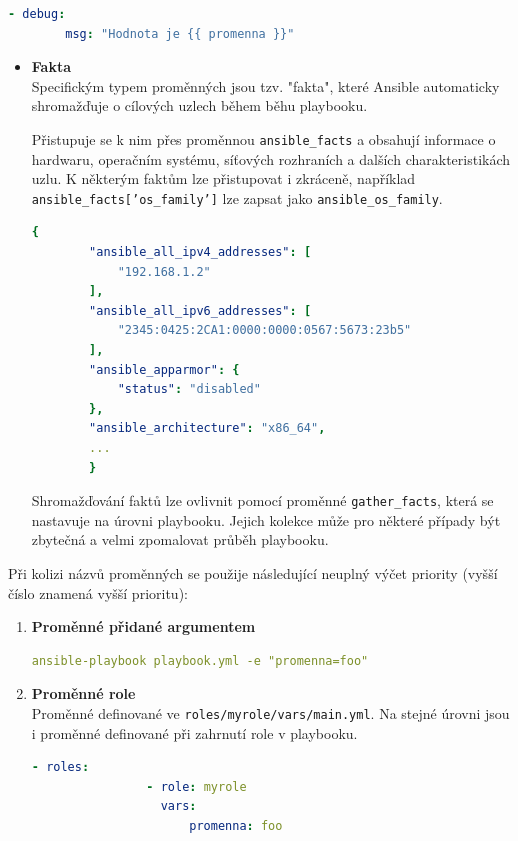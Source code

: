\begin{itemize}
    \begin{lstlisting}[language=YAML, caption={Použití proměnné}, label={lst:ansiblepromennapouziti}, captionpos=b]
    - debug:
        msg: "Hodnota je {{ promenna }}"
    \end{lstlisting}

    \begin{itemize}
        \item \textbf{Fakta} \\
        Specifickým typem proměnných jsou tzv. "fakta", které Ansible automaticky shromažďuje o cílových uzlech během běhu playbooku.
        
        Přistupuje se k nim přes proměnnou \texttt{ansible\_facts} a obsahují informace o hardwaru, operačním systému, síťových rozhraních a dalších charakteristikách uzlu.
        K některým faktům lze přistupovat i zkráceně, například \texttt{ansible\_facts['os\_family']} lze zapsat jako \texttt{ansible\_os\_family}. \cite{ansibledocs}
         
        \begin{lstlisting}[language=YAML, caption={Shromážděná fakta}, label={lst:ansiblefacts}, captionpos=b]
        {
        "ansible_all_ipv4_addresses": [
            "192.168.1.2"
        ],
        "ansible_all_ipv6_addresses": [
            "2345:0425:2CA1:0000:0000:0567:5673:23b5"
        ],
        "ansible_apparmor": {
            "status": "disabled"
        },
        "ansible_architecture": "x86_64",
        ...
        }
        \end{lstlisting}

        Shromažďování faktů lze ovlivnit pomocí proměnné \texttt{gather\_facts}, která se nastavuje na úrovni playbooku.
        Jejich kolekce může pro některé případy být zbytečná a velmi zpomalovat průběh playbooku. \cite{ansibledocs}
    \end{itemize}

    Při kolizi názvů proměnných se použije následující neuplný výčet priority (vyšší číslo znamená vyšší prioritu):
    \begin{enumerate}
        \item \textbf{Proměnné přidané argumentem}
        \begin{lstlisting}[language=YAML, caption={Proměnné přidané argumentem}, label={lst:ansibleargumentvar}, captionpos=b]
        ansible-playbook playbook.yml -e "promenna=foo"
        \end{lstlisting}

        \item \textbf{Proměnné role} \\
            Proměnné definované ve \texttt{roles/myrole/vars/main.yml}.
            Na stejné úrovni jsou i proměnné definované při zahrnutí role v playbooku.
            \begin{lstlisting}[language=YAML, caption={Proměnné při zahrnutí role}, label={lst:ansiblerolevar}, captionpos=b]
            - roles:
                - role: myrole
                  vars: 
                      promenna: foo
            \end{lstlisting}
        

\end{enumerate}
\end{itemize}
